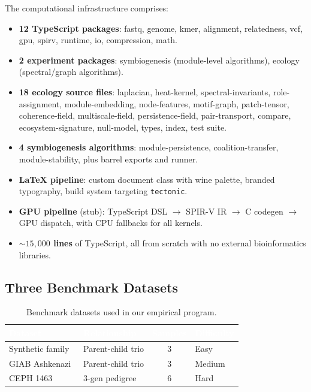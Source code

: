\documentclass{../yalumba}
\begin{document}
The computational infrastructure comprises:

\begin{itemize}
  \item \textbf{12 TypeScript packages}: fastq, genome, kmer, alignment,
    relatedness, vcf, gpu, spirv, runtime, io, compression, math.
  \item \textbf{2 experiment packages}: symbiogenesis (module-level
    algorithms), ecology (spectral/graph algorithms).
  \item \textbf{18 ecology source files}: laplacian, heat-kernel,
    spectral-invariants, role-assignment, module-embedding,
    node-features, motif-graph, patch-tensor, coherence-field,
    multiscale-field, persistence-field, pair-transport, compare,
    ecosystem-signature, null-model, types, index, test suite.
  \item \textbf{4 symbiogenesis algorithms}: module-persistence,
    coalition-transfer, module-stability, plus barrel exports and
    runner.
  \item \textbf{LaTeX pipeline}: custom document class with wine palette,
    branded typography, build system targeting \texttt{tectonic}.
  \item \textbf{GPU pipeline} (stub): TypeScript DSL $\to$ SPIR-V IR
    $\to$ C codegen $\to$ GPU dispatch, with CPU fallbacks for all
    kernels.
  \item \textbf{${\sim}15{,}000$ lines} of TypeScript, all from scratch
    with no external bioinformatics libraries.
\end{itemize}

\subsection{Three Benchmark Datasets}
\label{sec:status:datasets}

\begin{table}[H]
  \centering
  \tablestyle
  \caption{Benchmark datasets used in our empirical program.}
  \label{tab:datasets}
  \begin{tabular}{llcl}
    \toprule
    \rowcolor{table-header}
    \textcolor{white}{\textbf{Dataset}} &
    \textcolor{white}{\textbf{Relationship}} &
    \textcolor{white}{\textbf{Samples}} &
    \textcolor{white}{\textbf{Difficulty}} \\
    \midrule
    Synthetic family & Parent-child trio & 3 & Easy \\
    GIAB Ashkenazi~\cite{zook2019giab} & Parent-child trio & 3 & Medium \\
    CEPH 1463~\cite{ceph1463} & 3-gen pedigree & 6 & Hard \\
    \bottomrule
  \end{tabular}
\end{table}
\end{document}
